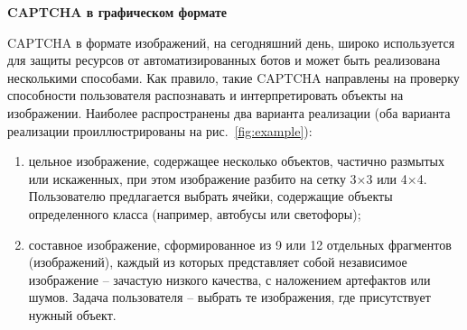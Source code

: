\textbf{CAPTCHA в графическом формате}

CAPTCHA в формате изображений, на сегодняшний день, широко используется для 
защиты ресурсов от автоматизированных ботов и может быть реализована несколькими 
способами. Как правило, такие CAPTCHA направлены на проверку способности 
пользователя распознавать и интерпретировать объекты на изображении. Наиболее 
распространены два варианта реализации (оба варианта реализации проиллюстрированы 
на рис.~\ref{fig:example}):
\begin{enumerate}
    \item цельное изображение, содержащее несколько объектов, частично размытых 
    или искаженных, при этом изображение разбито на сетку 3×3 или 4×4. 
    Пользователю предлагается выбрать ячейки, содержащие объекты определенного 
    класса (например, автобусы или светофоры);
    \item составное изображение, сформированное из 9 или 12 отдельных фрагментов 
    (изображений), каждый из которых представляет собой независимое изображение 
    -- зачастую низкого качества, с наложением артефактов или шумов. Задача 
    пользователя -- выбрать те изображения, где присутствует нужный объект.
\end{enumerate}

